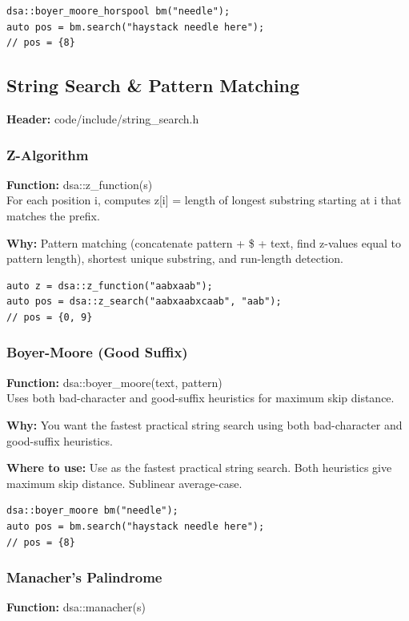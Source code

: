 \documentclass[11pt]{article}
\begin{document}
\begin{lstlisting}
dsa::boyer_moore_horspool bm("needle");
auto pos = bm.search("haystack needle here");
// pos = {8}
\end{lstlisting}

\subsection{String Search \& Pattern Matching}
\textbf{Header:} code/include/string\_search.h

\subsubsection{Z-Algorithm}
\textbf{Function:} dsa::z\_function(s)\\

For each position i, computes z[i] = length of longest substring starting at i that matches the prefix.

\textbf{Why:} Pattern matching (concatenate pattern + \$ + text, find z-values equal to pattern length), shortest unique substring, and run-length detection.

\begin{lstlisting}
auto z = dsa::z_function("aabxaab");
auto pos = dsa::z_search("aabxaabxcaab", "aab");
// pos = {0, 9}
\end{lstlisting}

\subsubsection{Boyer-Moore (Good Suffix)}
\textbf{Function:} dsa::boyer\_moore(text, pattern)\\

Uses both bad-character and good-suffix heuristics for maximum skip distance.

\textbf{Why:} You want the fastest practical string search using both bad-character and good-suffix heuristics. \par \textbf{Where to use:} Use as the fastest practical string search. Both heuristics give maximum skip distance. Sublinear average-case.

\begin{lstlisting}
dsa::boyer_moore bm("needle");
auto pos = bm.search("haystack needle here");
// pos = {8}
\end{lstlisting}

\subsubsection{Manacher's Palindrome}
\textbf{Function:} dsa::manacher(s)\\
\end{document}
